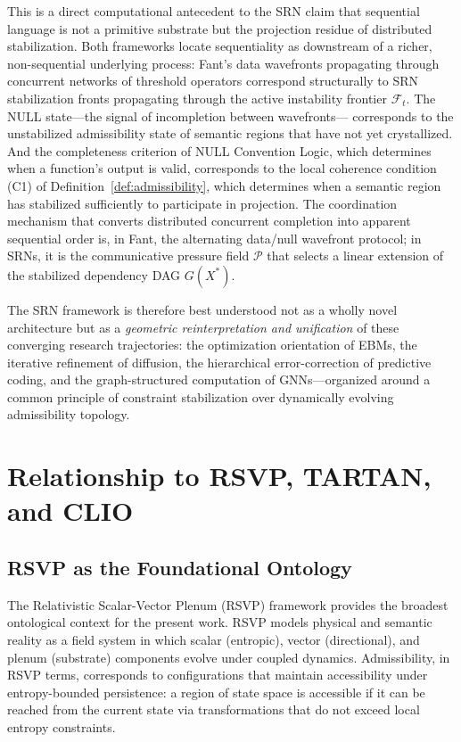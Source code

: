 \documentclass[11pt, a4paper]{article}
\theoremstyle{srn}
\theoremstyle{srnremark}
\begin{document}
This is a direct computational antecedent to the SRN claim that
sequential language is not a primitive substrate but the projection
residue of distributed stabilization.
Both frameworks locate sequentiality as downstream of a richer,
non-sequential underlying process: Fant's data wavefronts propagating
through concurrent networks of threshold operators correspond
structurally to SRN stabilization fronts propagating through the
active instability frontier $\mathcal{F}_t$.
The NULL state---the signal of incompletion between wavefronts---
corresponds to the unstabilized admissibility state of semantic
regions that have not yet crystallized.
And the completeness criterion of NULL Convention Logic, which
determines when a function's output is valid, corresponds to the
local coherence condition (C1) of Definition~\ref{def:admissibility},
which determines when a semantic region has stabilized sufficiently
to participate in projection.
The coordination mechanism that converts distributed concurrent
completion into apparent sequential order is, in Fant, the
alternating data/null wavefront protocol; in SRNs, it is the
communicative pressure field $\mathcal{P}$ that selects a linear
extension of the stabilized dependency DAG $G(X^*)$.

The SRN framework is therefore best understood not as a wholly novel
architecture but as a \emph{geometric reinterpretation and
unification} of these converging research trajectories: the
optimization orientation of EBMs, the iterative refinement of
diffusion, the hierarchical error-correction of predictive coding, and
the graph-structured computation of GNNs---organized around a common
principle of constraint stabilization over dynamically evolving
admissibility topology.

\section{Relationship to RSVP, TARTAN, and CLIO}
\label{sec:rsvp}

\subsection{RSVP as the Foundational Ontology}

The Relativistic Scalar-Vector Plenum (RSVP) framework provides the
broadest ontological context for the present work.
RSVP models physical and semantic reality as a field system in which
scalar (entropic), vector (directional), and plenum (substrate)
components evolve under coupled dynamics.
Admissibility, in RSVP terms, corresponds to configurations that
maintain accessibility under entropy-bounded persistence: a region of
state space is accessible if it can be reached from the current state
via transformations that do not exceed local entropy constraints.
\end{document}
